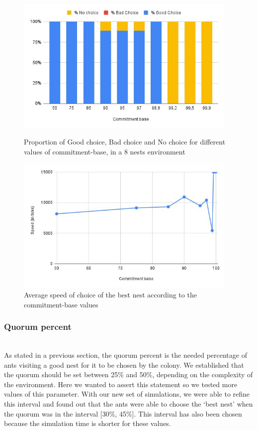 \documentclass[9pt]{pnas-new}
\begin{document}
\begin{figure}[h!tbp]
    \begin{minipage}[c]{.46\linewidth}
        \centering
        \includegraphics[width=0.95\textwidth]{report-template/fig/commit_bar.jpeg}
        \caption{Proportion of Good choice, Bad choice and No choice for different values of commitment-base, in a 8 nests environment}
        \label{fig:vr8}
    \end{minipage}
    \hfill%
    \begin{minipage}[c]{.46\linewidth}
        \centering
        \includegraphics[width=0.95\textwidth]{report-template/fig/commit_diag.jpeg}
        \caption{Average speed of choice of the best nest according to the commitment-base values}
        \label{fig:c8}
    \end{minipage}
\end{figure} 
\subsubsection*{Quorum percent}
\\As stated in a previous section, the quorum percent is the needed percentage of ants visiting a good nest for it to be chosen by the colony. We established that the quorum should be set between 25\% and 50\%, depending on the complexity of the environment. Here we wanted to assert this statement so we tested more values of this parameter. 
With our new set of simulations, we were able to refine this interval and found out that the ants were able to choose the ‘best nest’ when the quorum was in the interval [30\%, 45\%].
This interval has also been chosen because the simulation time is shorter for these values.
\end{document}
